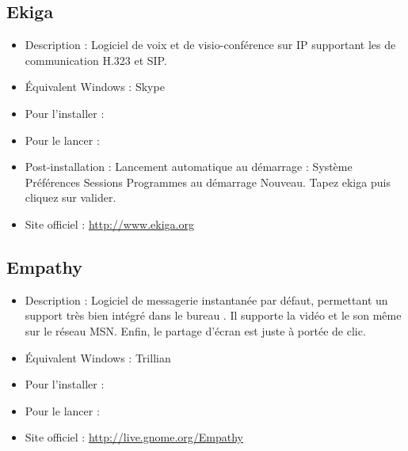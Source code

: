 \subsection{Ekiga}
\begin{itemize}
\begingroup
{}
\item Description : Logiciel de voix et de visio-conférence sur IP supportant les  de communication H.323 et SIP.{\par}
\item Équivalent Windows : Skype{\par}
\item Pour l'installer : 
\item Pour le lancer : 
\item Post-installation : Lancement automatique au démarrage : Système \FlecheDroite  Préférences \FlecheDroite Sessions \FlecheDroite Programmes au démarrage \FlecheDroite Nouveau. Tapez ekiga puis cliquez sur valider.{\par}
\item Site officiel : \url{http://www.ekiga.org}{\par}
\endgroup
\end{itemize}

\subsection{Empathy}
\label{RefEmpathy}
\begin{itemize}
\begingroup
{}
\item Description : Logiciel de messagerie instantanée par défaut, permettant un support  très bien intégré dans le bureau . Il supporte la vidéo et le son même sur le réseau MSN. Enfin, le partage d'écran est juste à portée de clic.{\par}
\item Équivalent Windows : Trillian{\par}
\item Pour l'installer : 
\item Pour le lancer : 
\item Site officiel : \url{http://live.gnome.org/Empathy}{\par}
\endgroup
\end{itemize}

